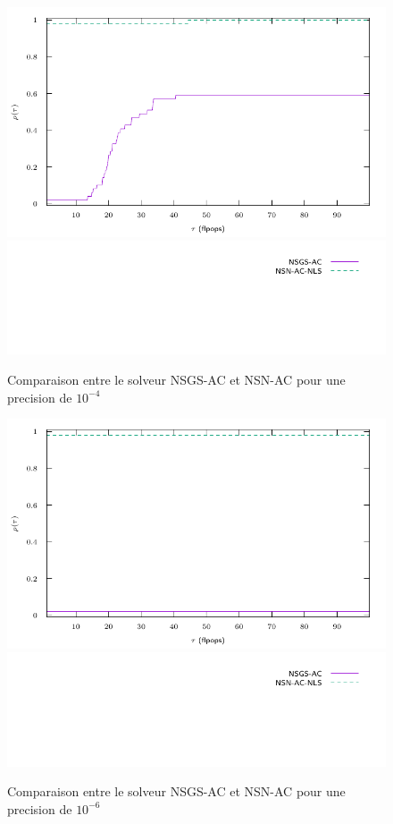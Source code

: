 \documentclass{CSMA2017}
\begin{document}
\begin{figure}
  \centering
  \includegraphics{figure/LowWall_FEM.1e-4/simple/profile-LMGC_LowWall_FEM.pdf}
  \includegraphics{figure/LowWall_FEM.1e-4/simple/profile-LMGC_LowWall_FEM_legend.pdf}
  \caption{Comparaison entre le solveur NSGS-AC et NSN-AC pour une precision de $10^{-4}$}
  \label{fig:LowWall_FEM.1e-4.simple}
\end{figure}
\begin{figure}
  \centering
  \includegraphics{figure/LowWall_FEM.1e-6/simple/profile-LMGC_LowWall_FEM.pdf}
  \includegraphics{figure/LowWall_FEM.1e-6/simple/profile-LMGC_LowWall_FEM_legend.pdf}
  \caption{Comparaison entre le solveur NSGS-AC et NSN-AC pour une precision de $10^{-6}$}
  \label{fig:LowWall_FEM.1e-6.simple}
\end{figure}
\end{document}
